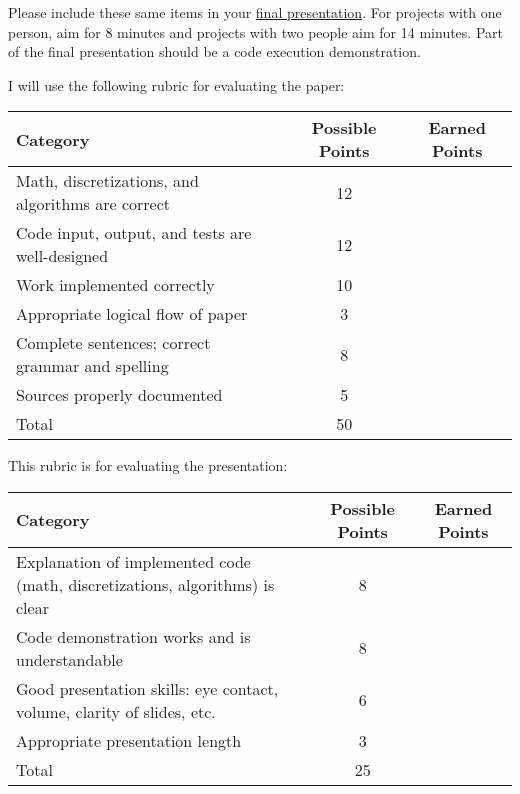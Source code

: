 \documentclass[a4paper, 12 pt]{curve}
\begin{document}
\vspace*{2em}
Please include these same items in your \underline{final presentation}. For projects with one person, aim for 8 minutes and projects with two people aim for 14 minutes. Part of the final presentation should be a code execution demonstration.

\clearpage
I will use the following rubric for evaluating the paper:

\begin{center}
\begin{tabu}{| X | c | c |}\hline
\textbf{Category} & \textbf{Possible Points} & \textbf{Earned Points} \\ \hline \hline
Math, discretizations, and algorithms are correct & 12 & \\ \hline
Code input, output, and tests are well-designed & 12 & \\ \hline
Work implemented correctly & 10 & \\ \hline
Appropriate logical flow of paper & 3 & \\ \hline
Complete sentences; correct grammar and spelling & 8 & \\ \hline
Sources properly documented & 5 & \\ \hline
Total & 50 & \\\hline
\end{tabu} 
\end{center}

\vspace*{1 em}
This rubric is for evaluating the presentation:


\begin{center}
\begin{tabu}{| X | c | c |}\hline
\textbf{Category} & \textbf{Possible Points} & \textbf{Earned Points} \\ \hline \hline
Explanation of implemented code (math, discretizations, algorithms) is clear & 8 & \\ \hline
Code demonstration works and is understandable & 8 & \\ \hline
Good presentation skills: eye contact, volume, clarity of slides, etc. & 6 & \\ \hline
Appropriate presentation length & 3 & \\ \hline
Total & 25 & \\\hline
\end{tabu} 
\end{center}
\end{document}
